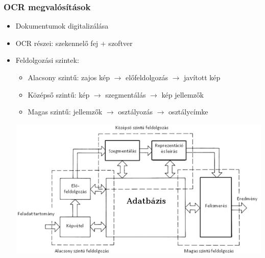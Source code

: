 \documentclass{beamer}
\begin{document}
\begin{frame}[fragile]
\frametitle{OCR megvalósítások}

\begin{itemize}
\item Dokumentumok digitalizálása
\item OCR részei: szekennelő fej + szoftver
\item Feldolgozási szintek:
\begin{itemize}
	\item Alacsony szintű: zajos kép $\rightarrow$ előfeldolgozás $\rightarrow$ javított kép
	\item Középső szintű: kép $\rightarrow$ szegmentálás $\rightarrow$ kép jellemzők
	\item Magas szintű: jellemzők $\rightarrow$ osztályozás $\rightarrow$ osztálycímke
\end{itemize}

\includegraphics[scale=0.45, center]{ocr}
\end{itemize}




\end{frame}
\end{document}
